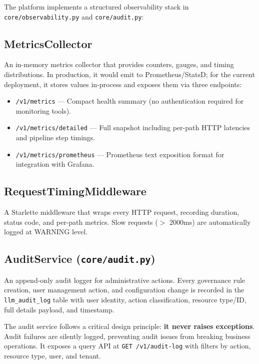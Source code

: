 \documentclass[12pt,a4paper,twoside]{report}
\begin{document}
The platform implements a structured observability stack in \texttt{core/observability.py} and \texttt{core/audit.py}:

\subsection{MetricsCollector}

An in-memory metrics collector that provides counters, gauges, and timing distributions. In production, it would emit to Prometheus/StatsD; for the current deployment, it stores values in-process and exposes them via three endpoints:

\begin{itemize}
  \item \texttt{/v1/metrics} --- Compact health summary (no authentication required for monitoring tools).
  \item \texttt{/v1/metrics/detailed} --- Full snapshot including per-path HTTP latencies and pipeline step timings.
  \item \texttt{/v1/metrics/prometheus} --- Prometheus text exposition format for integration with Grafana.
\end{itemize}

\subsection{RequestTimingMiddleware}

A Starlette middleware that wraps every HTTP request, recording duration, status code, and per-path metrics. Slow requests ($>$ 2000ms) are automatically logged at WARNING level.

\subsection{AuditService (\texttt{core/audit.py})}

An append-only audit logger for administrative actions. Every governance rule creation, user management action, and configuration change is recorded in the \texttt{llm\_audit\_log} table with user identity, action classification, resource type/ID, full details payload, and timestamp.

The audit service follows a critical design principle: \textbf{it never raises exceptions}. Audit failures are silently logged, preventing audit issues from breaking business operations. It exposes a query API at \texttt{GET /v1/audit-log} with filters by action, resource type, user, and tenant.
\end{document}
